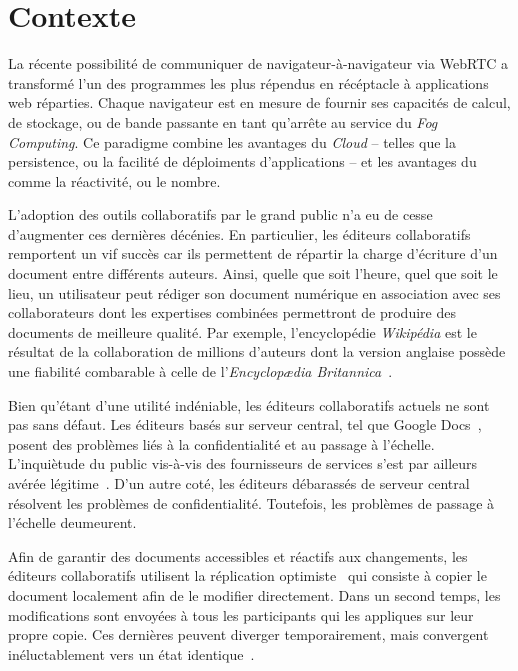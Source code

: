 
\section{Contexte}

La récente possibilité de communiquer de navigateur-à-navigateur via WebRTC a
transformé l'un des programmes les plus répendus en récéptacle à applications
web réparties. Chaque navigateur est en mesure de fournir ses capacités de
calcul, de stockage, ou de bande passante en tant qu'arrête au service du
\emph{Fog Computing}. Ce paradigme combine les avantages du \emph{Cloud} --
telles que la persistence, ou la facilité de déploiments d'applications -- et
les avantages du  comme la réactivité, ou le nombre.

L'adoption des outils collaboratifs par le grand public n'a eu de cesse
d'augmenter ces dernières décénies. En particulier, les éditeurs
collaboratifs~\cite{ellis1991groupware} remportent un vif succès car ils
permettent de répartir la charge d'écriture d'un document entre différents
auteurs. Ainsi, quelle que soit l'heure, quel que soit le lieu, un utilisateur
peut rédiger son document numérique en association avec ses collaborateurs dont
les expertises combinées permettront de produire des documents de meilleure
qualité. Par exemple, l'encyclopédie \emph{Wikipédia} est le résultat de la
collaboration de millions d'auteurs dont la version anglaise possède une
fiabilité combarable à celle de l'\emph{Encyclop\ae{}dia
Britannica}~\cite{giles2005internet}.

Bien qu'étant d'une utilité indéniable, les éditeurs collaboratifs actuels ne
sont pas sans défaut. Les éditeurs basés sur serveur central, tel que Google
Docs~\cite{nichols1995high}, posent des problèmes liés à la confidentialité et
au passage à l'échelle. L'inquiètude du public vis-à-vis des fournisseurs de
services s'est par ailleurs avérée légitime~\cite{gellman2013us}. D'un autre
coté, les éditeurs débarassés de serveur central résolvent les problèmes de
confidentialité. Toutefois, les problèmes de passage à l'échelle deumeurent.

Afin de garantir des documents accessibles et réactifs aux changements, les
éditeurs collaboratifs utilisent la réplication
optimiste~\cite{saito2005optimistic} qui consiste à copier le document
localement afin de le modifier directement. Dans un second temps, les
modifications sont envoyées à tous les participants qui les appliques sur leur
propre copie.  Ces dernières peuvent diverger temporairement, mais convergent
inéluctablement vers un état identique~\cite{bailis2013eventual}.

